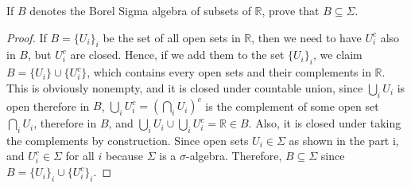 \begin{question}
    If $B$ denotes the Borel Sigma algebra of subsets of $\mathbb{R}$, prove that $B \subseteq \Sigma$.
\end{question}

\begin{answer}
    \begin{proof}
        If $B = \{U_i\}_i$ be the set of all open sets in $\mathbb{R}$, then we need to have $U_i^c$ also in $B$, but $U_i^c$ are closed. Hence, if we add them to the set $\{U_i\}_i$, we claim $B = \{U_i\} \cup \{U_i^c\}$, which contains every open sets and their complements in $\mathbb{R}$. This is obviously nonempty, and it is closed under countable union, since $\bigcup_{i}U_i$ is open therefore in $B$, $\bigcup_{i}U_i^c = (\bigcap_{i}U_i)^c$ is the complement of some open set $\bigcap_{i}U_i$, therefore in $B$, and $\bigcup_{i}U_i\cup\bigcup_{i}U_i^c = \mathbb{R} \in B$. Also, it is closed under taking the complements by construction. Since open sets $U_i \in \Sigma$ as shown in the part i, and $U_i^c \in \Sigma$ for all $i$ because $\Sigma$ is a $\sigma$-algebra. Therefore, $B \subseteq \Sigma$ since $B = \{U_i\}_i \cup \{U_i^c\}_i$.
    \end{proof}
\end{answer}